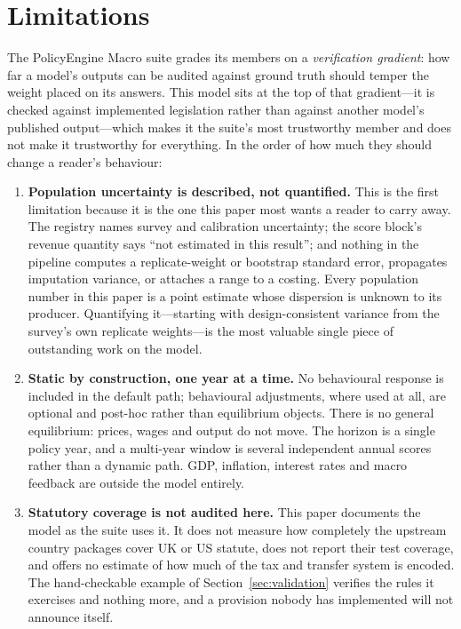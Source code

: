 \section{Limitations}
\label{sec:limitations}

The PolicyEngine Macro suite grades its members on a \emph{verification gradient}: how far a model's outputs can be audited against ground truth should temper the weight placed on its answers. This model sits at the top of that gradient---it is checked against implemented legislation rather than against another model's published output---which makes it the suite's most trustworthy member and does not make it trustworthy for everything. In the order of how much they should change a reader's behaviour:

\begin{enumerate}
\item \textbf{Population uncertainty is described, not quantified.} This is the first limitation because it is the one this paper most wants a reader to carry away. The registry names survey and calibration uncertainty; the score block's revenue quantity says ``not estimated in this result''; and nothing in the pipeline computes a replicate-weight or bootstrap standard error, propagates imputation variance, or attaches a range to a costing. Every population number in this paper is a point estimate whose dispersion is unknown to its producer. Quantifying it---starting with design-consistent variance from the survey's own replicate weights---is the most valuable single piece of outstanding work on the model.

\item \textbf{Static by construction, one year at a time.} No behavioural response is included in the default path; behavioural adjustments, where used at all, are optional and post-hoc rather than equilibrium objects. There is no general equilibrium: prices, wages and output do not move. The horizon is a single policy year, and a multi-year window is several independent annual scores rather than a dynamic path. GDP, inflation, interest rates and macro feedback are outside the model entirely.

\item \textbf{Statutory coverage is not audited here.} This paper documents the model as the suite uses it. It does not measure how completely the upstream country packages cover UK or US statute, does not report their test coverage, and offers no estimate of how much of the tax and transfer system is encoded. The hand-checkable example of Section~\ref{sec:validation} verifies the rules it exercises and nothing more, and a provision nobody has implemented will not announce itself.


\end{enumerate}
